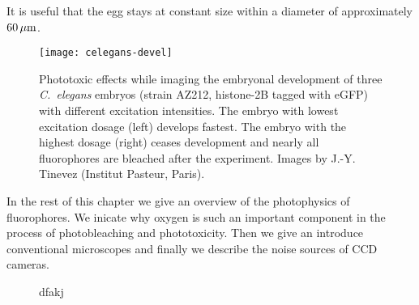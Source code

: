 It is useful that the egg stays at constant size within a diameter   
of approximately $\unit[60]{\mu m}$.

\begin{figure}[!htb]
  \centering
  \texttt{[image: celegans-devel]}
  \caption{Phototoxic effects while imaging the embryonal development
    of three \emph{C.~elegans} embryos (strain AZ212, histone-2B
    tagged with eGFP) with different excitation intensities. The
    embryo with lowest excitation dosage (left) develops fastest. The
    embryo with the highest dosage (right) ceases development and
    nearly all fluorophores are bleached after the experiment. Images by
    J.-Y. Tinevez (Institut Pasteur, Paris).}
  \label{fig:celegans-devel}
\end{figure}


In the rest of this chapter we give an overview of the photophysics of
fluorophores. We inicate why oxygen is such an important component in
the process of photobleaching and phototoxicity.  Then we give an
introduce conventional microscopes and finally we describe the noise
sources of CCD cameras.

\begin{figure}[!htb]
  \centering
  \caption{dfakj}
  \label{fig:worm-survival}
\end{figure}
